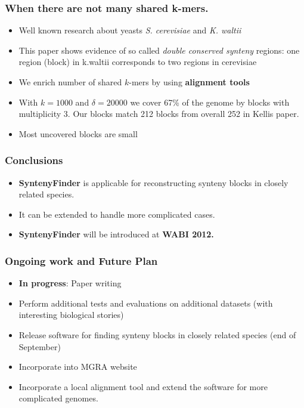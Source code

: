 \documentclass[svgnames,14pt]{beamer}
\begin{document}
\begin{frame}
\frametitle{When there are not many shared k-mers.}
\begin{itemize}
\item Well known research about yeasts \textit{S. cerevisiae} and \textit{K. waltii}  
\item This paper shows evidence of so called \textit{double conserved synteny} regions: one region (block) in k.waltii corresponds to two
regions in cerevisiae
\item We enrich number of shared \(k\)-mers by using \textbf{alignment tools}
\item With \(k = 1000\) and \(\delta = 20 000 \) we cover 67\% of the genome by blocks with multiplicity 3. Our blocks match 212 blocks
from overall 252 in Kellis paper.
\item Most uncovered blocks are small
\end{itemize}
\end{frame}


\begin{frame}
\frametitle{Conclusions}
\begin{itemize}
    \item \textbf{SyntenyFinder} is applicable for reconstructing synteny blocks in closely related species.
\item It can be extended to handle more complicated cases. 
\item \textbf{SyntenyFinder} will be introduced at \textbf{WABI 2012.}
\end{itemize}
\end{frame}



\begin{frame}
\frametitle{Ongoing work and Future Plan}
\begin{itemize}
    \item \textbf{In progress}: Paper writing
\item Perform additional tests and evaluations on additional datasets (with interesting biological stories)
\item Release software for finding synteny blocks in closely related species (end of September)
\item Incorporate into MGRA website
\item Incorporate a local alignment tool and extend the software for more complicated genomes. 
\end{itemize}
\end{frame}
\end{document}
